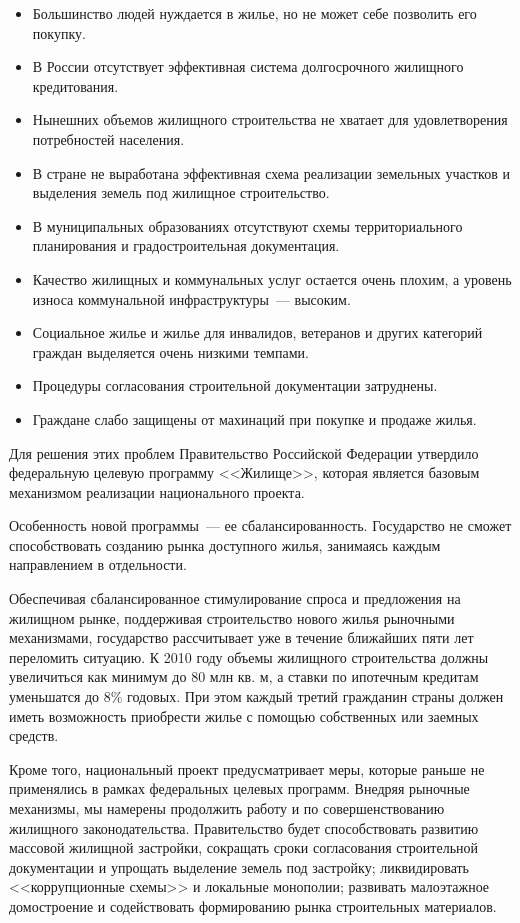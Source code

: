 \documentclass[article, 12pt, russian, oneside]{ncc}
\begin{document}
\begin{itemize}
\item Большинство людей нуждается в жилье, но не может себе позволить
  его покупку.
\item В России отсутствует эффективная система долгосрочного жилищного
  кредитования.
\item Нынешних объемов жилищного строительства не хватает для
  удовлетворения потребностей населения.
\item В стране не выработана эффективная схема реализации земельных
  участков и выделения земель под жилищное строительство.
\item В муниципальных образованиях отсутствуют схемы территориального
  планирования и градостроительная документация.
\item Качество жилищных и коммунальных услуг остается очень плохим, а
  уровень износа коммунальной инфраструктуры~---
 высоким.
\item Социальное жилье и жилье для инвалидов, ветеранов и других
  категорий граждан выделяется очень низкими темпами.
\item Процедуры согласования строительной документации затруднены.
\item Граждане слабо защищены от махинаций при покупке и продаже
  жилья.
\end{itemize}

Для решения этих проблем Правительство Российской Федерации утвердило
федеральную целевую программу <<Жилище>>, которая является базовым
механизмом реализации национального проекта.

Особенность новой программы~--- ее сбалансированность. Государство не
сможет способствовать созданию рынка доступного жилья, занимаясь
каждым направлением в отдельности.

Обеспечивая сбалансированное стимулирование спроса и предложения на
жилищном рынке, поддерживая строительство нового жилья рыночными
механизмами, государство рассчитывает уже в течение ближайших пяти лет
переломить ситуацию. К 2010 году объемы жилищного строительства должны
увеличиться как минимум до 80 млн кв. м, а ставки по ипотечным
кредитам уменьшатся до 8\% годовых. При этом каждый третий гражданин
страны должен иметь возможность приобрести жилье с помощью собственных
или заемных средств.

Кроме того, национальный проект предусматривает меры, которые раньше
не применялись в рамках федеральных целевых программ. Внедряя рыночные
механизмы, мы намерены продолжить работу и по совершенствованию
жилищного законодательства. Правительство будет способствовать
развитию массовой жилищной застройки, сокращать сроки согласования
строительной документации и упрощать выделение земель под застройку;
ликвидировать <<коррупционные схемы>> и локальные монополии; развивать
малоэтажное домостроение и содействовать формированию рынка
строительных материалов.
\end{document}

